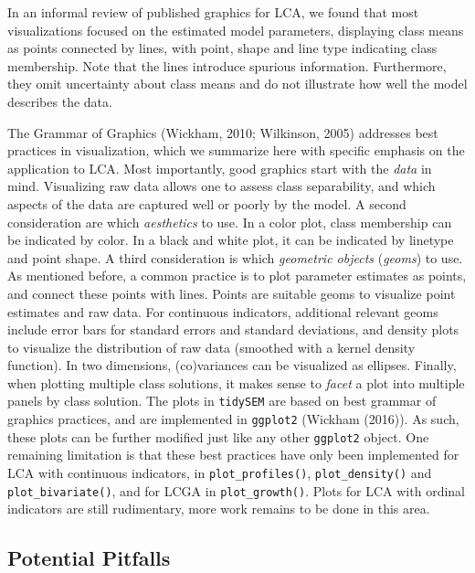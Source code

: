 \documentclass[
  ,man,floatsintext]{apa6}
\begin{document}
In an informal review of published graphics for LCA,
we found that most visualizations focused on the estimated model parameters,
displaying class means as points connected by lines, with point, shape and line type indicating class membership.
Note that the lines introduce spurious information.
Furthermore, they omit uncertainty about class means and do not illustrate how well the model describes the data.

The Grammar of Graphics (Wickham, 2010; Wilkinson, 2005)
addresses best practices in visualization,
which we summarize here with specific emphasis on the application to LCA.
Most importantly, good graphics start with the \emph{data} in mind.
Visualizing raw data allows one to assess class separability,
and which aspects of the data are captured well or poorly by the model.
A second consideration are which \emph{aesthetics} to use.
In a color plot, class membership can be indicated by color.
In a black and white plot, it can be indicated by linetype and point shape.
A third consideration is which \emph{geometric objects} (\emph{geoms}) to use.
As mentioned before, a common practice is to plot parameter estimates as points,
and connect these points with lines.
Points are suitable geoms to visualize point estimates and raw data.
For continuous indicators, additional relevant geoms include error bars for standard errors and standard deviations,
and density plots to visualize the distribution of raw data (smoothed with a kernel density function).
In two dimensions, (co)variances can be visualized as ellipses.
Finally, when plotting multiple class solutions,
it makes sense to \emph{facet} a plot into multiple panels by class solution.
The plots in \texttt{tidySEM} are based on best grammar of graphics practices,
and are implemented in \texttt{ggplot2} (Wickham (2016)).
As such, these plots can be further modified just like any other \texttt{ggplot2} object.
One remaining limitation is that these best practices have only been implemented for LCA with continuous indicators, in \texttt{plot\_profiles()}, \texttt{plot\_density()} and \texttt{plot\_bivariate()}, and for LCGA in \texttt{plot\_growth()}. Plots for LCA with ordinal indicators are still rudimentary, more work remains to be done in this area.

\hypertarget{potential-pitfalls}{%
\subsection{Potential Pitfalls}\label{potential-pitfalls}}
\end{document}
